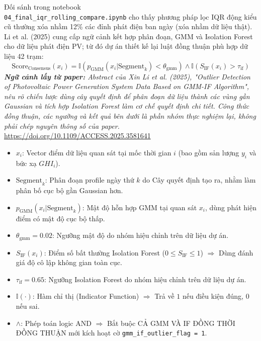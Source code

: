\documentclass[12pt,a4paper]{article}
\begin{document}
Đối sánh trong notebook\\ \texttt{04\_final\_\allowbreak iqr\_\allowbreak rolling\_\allowbreak compare.ipynb} cho thấy phương pháp lọc IQR động kiểu cũ thường xóa nhầm 12\% các đỉnh phát điện ban ngày (xóa nhầm dữ liệu thật). Li et al. (2025) cung cấp ngữ cảnh kết hợp phân đoạn, GMM và Isolation Forest cho dữ liệu phát điện PV; từ đó dự án thiết kế lại luật đồng thuận phù hợp dữ liệu 42 trạm:
\begin{equation}
    \text{Score}_{\text{Consensus}}(x_i) = \mathbb{I}\left(p_{\text{GMM}}(x_i | \text{Segment}_k) < \theta_{\text{gmm}}\right) \land \mathbb{I}\left(S_{\text{IF}}(x_i) > \tau_{\text{if}}\right)
\end{equation}
\textit{\textbf{Ngữ cảnh lấy từ paper:} Abstract của Xin Li et al. (2025), "Outlier Detection of Photovoltaic Power Generation System Data Based on GMM-IF Algorithm", nêu rõ chiến lược dùng cây quyết định để phân đoạn dữ liệu thành các vùng gần Gaussian và tích hợp Isolation Forest làm cơ chế quyết định chi tiết. Công thức đồng thuận, các ngưỡng và kết quả bên dưới là phần nhóm thực nghiệm lại, không phải chép nguyên thông số của paper.}\\
\url{https://doi.org/10.1109/ACCESS.2025.3581641}

\begin{itemize}
    \item $x_i$: Vector điểm dữ liệu quan sát tại mốc thời gian $i$ (bao gồm sản lượng $y_i$ và bức xạ $GHI_i$).
    \item $\text{Segment}_k$: Phân đoạn profile ngày thứ $k$ do Cây quyết định tạo ra, nhằm làm phân bố cục bộ gần Gaussian hơn.
    \item $p_{\text{GMM}}(x_i | \text{Segment}_k)$: Mật độ hỗn hợp GMM tại quan sát $x_i$, dùng phát hiện điểm có mật độ cục bộ thấp.
    \item $\theta_{\text{gmm}} = 0.02$: Ngưỡng mật độ do nhóm hiệu chỉnh trên dữ liệu dự án.
    \item $S_{\text{IF}}(x_i)$: Điểm số bất thường Isolation Forest ($0 \le S_{\text{IF}} \le 1$) $\Rightarrow$ Dùng đánh giá độ cô lập không gian toàn cục.
    \item $\tau_{\text{if}} = 0.65$: Ngưỡng Isolation Forest do nhóm hiệu chỉnh trên dữ liệu dự án.
    \item $\mathbb{I}(\cdot)$: Hàm chỉ thị (Indicator Function) $\Rightarrow$ Trả về $1$ nếu điều kiện đúng, $0$ nếu sai.
    \item $\land$: Phép toán logic AND $\Rightarrow$ Bắt buộc CẢ GMM VÀ IF ĐỒNG THỜI ĐỒNG THUẬN mới kích hoạt cờ \texttt{gmm\_if\_outlier\_flag = 1}.
\end{itemize}
\end{document}
